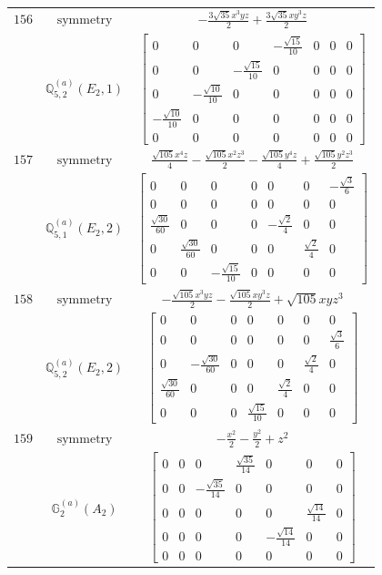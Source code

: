 \documentclass[fleqn,8pt,landscape]{jsarticle}
\begin{document}
\begin{longtable}{ccc}
$ 156 $ & $ \text{symmetry} $ & $ - \frac{3 \sqrt{35} x^{3} y z}{2} + \frac{3 \sqrt{35} x y^{3} z}{2} $ \\
$  $ & $ \mathbb{Q}_{5,2}^{(a)}(E_{2},1) $ & $ \begin{bmatrix} 0 & 0 & 0 & - \frac{\sqrt{15}}{10} & 0 & 0 & 0 \\ 0 & 0 & - \frac{\sqrt{15}}{10} & 0 & 0 & 0 & 0 \\ 0 & - \frac{\sqrt{10}}{10} & 0 & 0 & 0 & 0 & 0 \\ - \frac{\sqrt{10}}{10} & 0 & 0 & 0 & 0 & 0 & 0 \\ 0 & 0 & 0 & 0 & 0 & 0 & 0 \end{bmatrix} $ \\ \hline
$ 157 $ & $ \text{symmetry} $ & $ \frac{\sqrt{105} x^{4} z}{4} - \frac{\sqrt{105} x^{2} z^{3}}{2} - \frac{\sqrt{105} y^{4} z}{4} + \frac{\sqrt{105} y^{2} z^{3}}{2} $ \\
$  $ & $ \mathbb{Q}_{5,1}^{(a)}(E_{2},2) $ & $ \begin{bmatrix} 0 & 0 & 0 & 0 & 0 & 0 & - \frac{\sqrt{3}}{6} \\ 0 & 0 & 0 & 0 & 0 & 0 & 0 \\ \frac{\sqrt{30}}{60} & 0 & 0 & 0 & - \frac{\sqrt{2}}{4} & 0 & 0 \\ 0 & \frac{\sqrt{30}}{60} & 0 & 0 & 0 & \frac{\sqrt{2}}{4} & 0 \\ 0 & 0 & - \frac{\sqrt{15}}{10} & 0 & 0 & 0 & 0 \end{bmatrix} $ \\ \hline
$ 158 $ & $ \text{symmetry} $ & $ - \frac{\sqrt{105} x^{3} y z}{2} - \frac{\sqrt{105} x y^{3} z}{2} + \sqrt{105} x y z^{3} $ \\
$  $ & $ \mathbb{Q}_{5,2}^{(a)}(E_{2},2) $ & $ \begin{bmatrix} 0 & 0 & 0 & 0 & 0 & 0 & 0 \\ 0 & 0 & 0 & 0 & 0 & 0 & \frac{\sqrt{3}}{6} \\ 0 & - \frac{\sqrt{30}}{60} & 0 & 0 & 0 & \frac{\sqrt{2}}{4} & 0 \\ \frac{\sqrt{30}}{60} & 0 & 0 & 0 & \frac{\sqrt{2}}{4} & 0 & 0 \\ 0 & 0 & 0 & \frac{\sqrt{15}}{10} & 0 & 0 & 0 \end{bmatrix} $ \\ \hline
$ 159 $ & $ \text{symmetry} $ & $ - \frac{x^{2}}{2} - \frac{y^{2}}{2} + z^{2} $ \\
$  $ & $ \mathbb{G}_{2}^{(a)}(A_{2}) $ & $ \begin{bmatrix} 0 & 0 & 0 & \frac{\sqrt{35}}{14} & 0 & 0 & 0 \\ 0 & 0 & - \frac{\sqrt{35}}{14} & 0 & 0 & 0 & 0 \\ 0 & 0 & 0 & 0 & 0 & \frac{\sqrt{14}}{14} & 0 \\ 0 & 0 & 0 & 0 & - \frac{\sqrt{14}}{14} & 0 & 0 \\ 0 & 0 & 0 & 0 & 0 & 0 & 0 \end{bmatrix} $ \\ \hline

\end{longtable}
\end{document}
